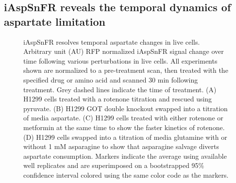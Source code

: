 \documentclass[9pt,lineno]{elife}
\begin{document}
\subsection{iAspSnFR reveals the temporal dynamics of aspartate limitation}
\lipsum[5]

\begin{figure}[ht!]
\centering
{}
\caption{
iAspSnFR resolves temporal aspartate changes in live cells.
Arbitrary unit (AU) RFP normalized iAspSnFR signal change over time following various perturbations in live cells.
All experiments shown are normalized to a pre-treatment scan, then treated with the specified drug or amino acid and scanned 30 min following treatment.
Grey dashed lines indicate the time of treatment.
(A) H1299 cells treated with a rotenone titration and rescued using pyruvate.
(B) H1299 GOT double knockout swapped into a titration of media aspartate.
(C) H1299 cells treated with either rotenone or metformin at the same time to show the faster kinetics of rotenone.
(D) H1299 cells swapped into a titration of media glutamine with or without 1 mM asparagine to show that asparagine salvage diverts aspartate consumption. 
Markers indicate the average using available well replicates and are superimposed on a bootstrapped 95\% confidence interval colored using the same color code as the markers.
}
\label{fig:Fig2}
\end{figure}
\end{document}
